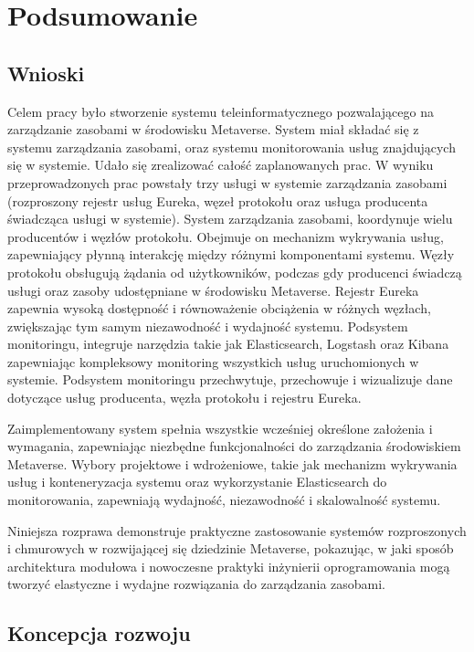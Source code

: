 \chapter{Podsumowanie}

\section{Wnioski}

Celem pracy było stworzenie systemu teleinformatycznego pozwalającego na zarządzanie zasobami w środowisku Metaverse. System miał składać się z systemu zarządzania zasobami, oraz systemu monitorowania usług znajdujących się w systemie. Udało się zrealizować całość zaplanowanych prac. W wyniku przeprowadzonych prac powstały trzy usługi w systemie zarządzania zasobami (rozproszony rejestr usług Eureka, węzeł protokołu oraz usługa producenta świadcząca usługi w systemie). System zarządzania zasobami, koordynuje wielu producentów i węzłów protokołu. Obejmuje on mechanizm wykrywania usług, zapewniający płynną interakcję między różnymi komponentami systemu. Węzły protokołu obsługują żądania od użytkowników, podczas gdy producenci świadczą usługi oraz zasoby udostępniane w środowisku Metaverse. Rejestr Eureka zapewnia wysoką dostępność i równoważenie obciążenia w różnych węzłach, zwiększając tym samym niezawodność i wydajność systemu. Podsystem monitoringu, integruje narzędzia takie jak Elasticsearch, Logstash oraz Kibana zapewniając kompleksowy monitoring wszystkich usług uruchomionych w systemie. Podsystem monitoringu przechwytuje, przechowuje i wizualizuje dane dotyczące usług producenta, węzła protokołu i rejestru Eureka. 

Zaimplementowany system spełnia wszystkie wcześniej określone założenia i wymagania, zapewniając niezbędne funkcjonalności do zarządzania środowiskiem Metaverse. Wybory projektowe i wdrożeniowe, takie jak mechanizm wykrywania usług i konteneryzacja systemu oraz wykorzystanie Elasticsearch do monitorowania, zapewniają wydajność, niezawodność i skalowalność systemu.

Niniejsza rozprawa demonstruje praktyczne zastosowanie systemów rozproszonych i chmurowych w rozwijającej się dziedzinie Metaverse, pokazując, w jaki sposób architektura modułowa i nowoczesne praktyki inżynierii oprogramowania mogą tworzyć elastyczne i wydajne rozwiązania do zarządzania zasobami.

\section{Koncepcja rozwoju}

